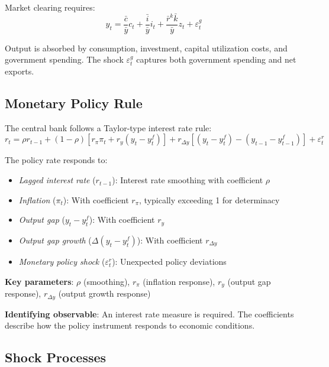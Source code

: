 \documentclass[12pt]{article}
\begin{document}
Market clearing requires:
\begin{equation}
\boxed{y_t = \frac{\bar{c}}{\bar{y}}c_t + \frac{\bar{i}}{\bar{y}}i_t + \frac{\bar{r}^k\bar{k}}{\bar{y}}z_t + \varepsilon^g_t}
\label{eq:resource}
\end{equation}

Output is absorbed by consumption, investment, capital utilization costs, and government spending. The shock $\varepsilon^g_t$ captures both government spending and net exports.

\subsection{Monetary Policy Rule}

The central bank follows a Taylor-type interest rate rule:
\begin{equation}
\boxed{r_t = \rho r_{t-1} + (1-\rho)[r_\pi\pi_t + r_y(y_t - y^f_t)] + r_{\Delta y}[(y_t - y^f_t) - (y_{t-1} - y^f_{t-1})] + \varepsilon^r_t}
\label{eq:taylor}
\end{equation}

The policy rate responds to:
\begin{itemize}
    \item \textit{Lagged interest rate} ($r_{t-1}$): Interest rate smoothing with coefficient $\rho$
    \item \textit{Inflation} ($\pi_t$): With coefficient $r_\pi$, typically exceeding 1 for determinacy
    \item \textit{Output gap} ($y_t - y^f_t$): With coefficient $r_y$
    \item \textit{Output gap growth} ($\Delta(y_t - y^f_t)$): With coefficient $r_{\Delta y}$
    \item \textit{Monetary policy shock} ($\varepsilon^r_t$): Unexpected policy deviations
\end{itemize}

\textbf{Key parameters}: $\rho$ (smoothing), $r_\pi$ (inflation response), $r_y$ (output gap response), $r_{\Delta y}$ (output growth response)

\textbf{Identifying observable}: An interest rate measure is required. The coefficients describe how the policy instrument responds to economic conditions.

\subsection{Shock Processes}
\end{document}
